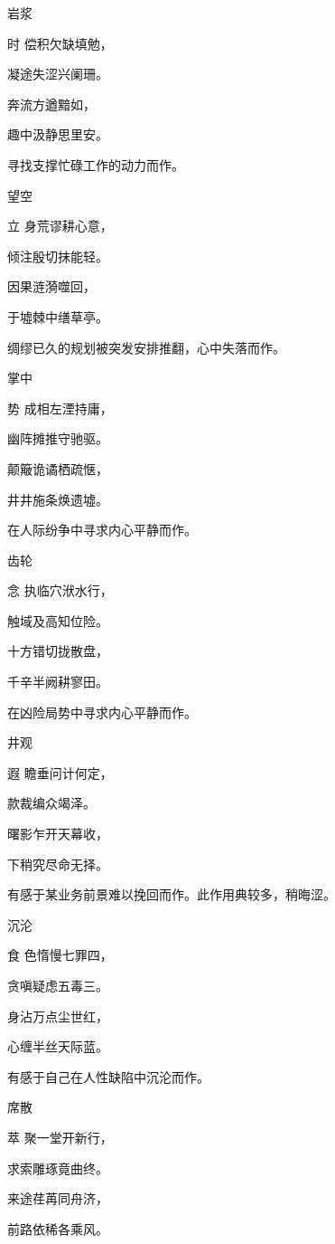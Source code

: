 \documentclass{article}
\newenvironment{poem}[3]{
\begin{minipage}{\textwidth}
\begin{pinyinscope}\begin{center}\Large\linespread{1.4}\selectfont #2\end{center}\end{pinyinscope}
\begin{pinyinscope}
	\begin{center}
	\Large\linespread{1.4}\rmfamily\selectfont #3
}{\end{center}
\end{pinyinscope}
\end{minipage}
}
\begin{document}
\begin{poem}{}{岩浆}
时偿积欠缺填勉，

凝途失涩兴阑珊。

奔流方遒黯如{}，

趣中汲静思里安。
\end{poem}

寻找支撑忙碌工作的动力而作。

\begin{poem}{}{望空}
立身荒谬耕心意，

倾注殷切抹能轻。

因果涟漪噬回{}，

于墟棘中缮草亭。
\end{poem}

绸缪已久的规划被突发安排推翻，心中失落而作。

\begin{poem}{}{掌中}
势成相左湮持庸，

幽阵摊推守驰驱。

颠簸诡谲栖疏惬，

井井施条焕遗墟。
\end{poem}

在人际纷争中寻求内心平静而作。

\begin{poem}{}{齿轮}
念执临穴{\textsf 洑}水行，

触域及高知位险。

十方错切拢散盘，

千辛半阙耕寥田。
\end{poem}

在凶险局势中寻求内心平静而作。

\begin{poem}{}{井观}
遐瞻垂问计何定，

款{}裁编众竭泽。

曙影乍开天幕收，

下稍究尽命无择。
\end{poem}

有感于某业务前景难以挽回而作。此作用典较多，稍晦涩。

\begin{poem}{}{沉沦}
食色惰慢七罪四，

贪嗔疑虑五毒三。

身沾万点尘世红，

心缠半丝天际蓝。
\end{poem}

有感于自己在人性缺陷中沉沦而作。

\begin{poem}{}{席散}
萃聚一堂开新行，

求索雕琢竟曲终。

来途荏苒同舟济，

前路依稀各乘风。
\end{poem}
\end{document}
